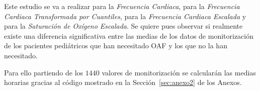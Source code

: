 Este estudio se va a realizar para la \textit{Frecuencia Cardiaca}, para la \textit{Frecuencia Cardiaca Transformada por Cuantiles}, para la \textit{Frecuencia Cardiaca Escalada} y para la \textit{Saturación de Oxígeno Escalada}. Se quiere pues observar si realmente existe una diferencia significativa entre las medias de los datos de monitorización de los pacientes pediátricos que han necesitado OAF y los que no la han necesitado.

Para ello partiendo de los $1440$ valores de monitorización se calcularán las medias horarias gracias al código mostrado en la Sección~\ref{sec:anexo2} de los Anexos.



